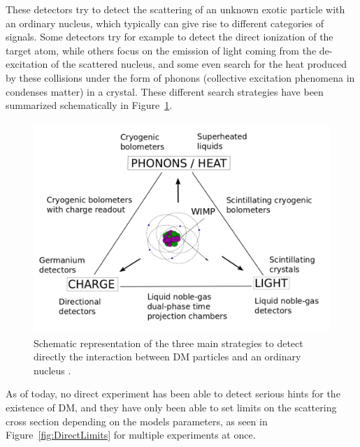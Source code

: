 \documentclass[a4paper, 10pt, openright]{report}
\begin{document}
These detectors try to detect the scattering of an unknown exotic particle with an ordinary nucleus, which typically can give rise to different categories of signals. Some detectors try for example to detect the direct ionization of the target atom, while others focus on the emission of light coming from the de-excitation of the scattered nucleus, and some even search for the heat produced by these collisions under the form of phonons (collective excitation phenomena in condenses matter) in a crystal. These different search strategies have been summarized schematically in Figure~\ref{figure:DirectWays}.

\begin{figure}[htbp]
\begin{center}
\includegraphics[width=12cm, height=8cm]{figs/DirectWays.png}
\caption{Schematic representation of the three main strategies to detect directly the interaction between \ac{DM} particles and an ordinary nucleus \cite{DirectWays}.}
\label{figure:DirectWays}
\end{center}
\end{figure}

As of today, no direct experiment has been able to detect serious hints for the existence of \ac{DM}, and they have only been able to set limits on the scattering cross section depending on the models parameters, as seen in Figure~\ref{fig:DirectLimits} for multiple experiments at once.
\end{document}
